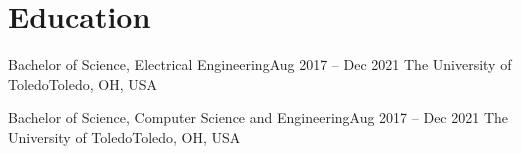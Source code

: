 \section{Education}
\mySubHeadingListStart

  \mySubHeading
    {Bachelor of Science, Electrical Engineering}{Aug 2017 -- Dec 2021}
    { The University of Toledo}{Toledo, OH, USA}
    \myItemListStart
    \myItemListEnd

  \mySubHeading
    {Bachelor of Science, Computer Science and Engineering}{Aug 2017 -- Dec 2021}
    { The University of Toledo}{Toledo, OH, USA}
    \myItemListStart
    \myItemListEnd

\mySubHeadingListEnd

